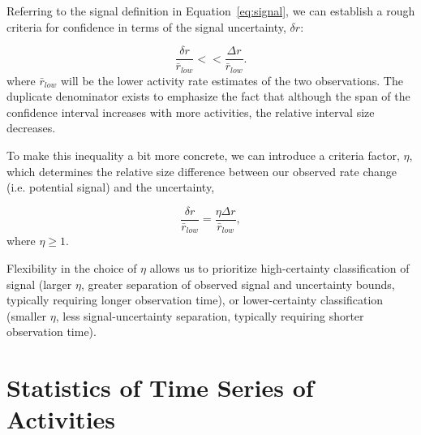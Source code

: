 \documentclass{article}
\begin{document}
Referring to the signal definition in Equation~\ref{eq:signal}, we can establish a rough criteria for 
confidence in terms of the signal uncertainty, $\delta r$:


\begin{equation}
    \label{eq:criteria}
    \frac{\delta r}{\bar{r}_{low}} << \frac{\Delta r}{\bar{r}_{low}}.
\end{equation}
where $\bar{r}_{low}$ will be the lower activity rate estimates of the two observations. The 
duplicate denominator exists to emphasize the fact that although the span of the 
confidence interval increases with more activities, the relative interval size decreases. 

To make this inequality a bit more concrete, we can introduce a criteria factor, $\eta$, which 
determines the relative size difference between our observed rate change (i.e. potential signal) 
and the uncertainty,


\begin{equation}
    \label{eq:criteriaParam}
    \frac{\delta r}{\bar{r}_{low}} = \frac{\eta \Delta r}{\bar{r}_{low}},
\end{equation}
where $\eta \ge 1$.

Flexibility in the choice of $\eta$ allows us to prioritize high-certainty classification of signal 
(larger $\eta$, greater separation of observed signal and uncertainty bounds, 
typically requiring longer observation time), or lower-certainty classification (smaller $\eta$, 
less signal-uncertainty separation, typically requiring shorter observation time).


\section{Statistics of Time Series of Activities} 
\label{time}
\end{document}
